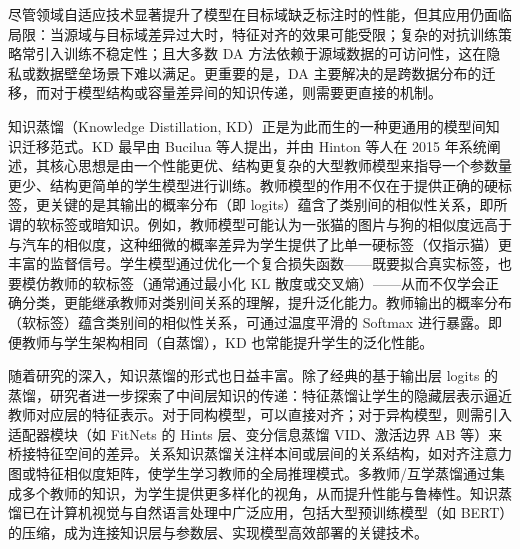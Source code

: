 \documentclass[../main.tex]{subfiles}
\begin{document}
尽管领域自适应技术显著提升了模型在目标域缺乏标注时的性能，但其应用仍面临局限：当源域与目标域差异过大时，特征对齐的效果可能受限；复杂的对抗训练策略常引入训练不稳定性；且大多数 DA 方法依赖于源域数据的可访问性，这在隐私或数据壁垒场景下难以满足\cite{surveytransferlearning_pan_2010,conditionaladversarialdomain_long_2018}。更重要的是，DA 主要解决的是跨数据分布的迁移，而对于模型结构或容量差异间的知识传递，则需要更直接的机制。

知识蒸馏（Knowledge Distillation, KD）正是为此而生的一种更通用的模型间知识迁移范式\cite{modelcompression_bucilua_2006,distillingknowledgeneural_hinton_2015}。KD 最早由 Bucilua 等人提出，并由 Hinton 等人在 2015 年系统阐述，其核心思想是由一个性能更优、结构更复杂的大型教师模型来指导一个参数量更少、结构更简单的学生模型进行训练。教师模型的作用不仅在于提供正确的硬标签，更关键的是其输出的概率分布（即 logits）蕴含了类别间的相似性关系，即所谓的软标签或暗知识。例如，教师模型可能认为一张猫的图片与狗的相似度远高于与汽车的相似度，这种细微的概率差异为学生提供了比单一硬标签（仅指示猫）更丰富的监督信号。学生模型通过优化一个复合损失函数——既要拟合真实标签，也要模仿教师的软标签（通常通过最小化 KL 散度或交叉熵）——从而不仅学会正确分类，更能继承教师对类别间关系的理解，提升泛化能力。教师输出的概率分布（软标签）蕴含类别间的相似性关系，可通过温度平滑的 Softmax 进行暴露\cite{distillingknowledgeneural_hinton_2015}。即便教师与学生架构相同（自蒸馏），KD 也常能提升学生的泛化性能\cite{bornagainneural_furlanello_2018}。

随着研究的深入，知识蒸馏的形式也日益丰富。除了经典的基于输出层 logits 的蒸馏，研究者进一步探索了中间层知识的传递：特征蒸馏让学生的隐藏层表示逼近教师对应层的特征表示\cite{fitnetshintsthin_romero_2015,variationalinformationdistillation_ahn_2019,knowledgetransfervia_heo_2019,payingmoreattention_zagoruyko_2017}。对于同构模型，可以直接对齐；对于异构模型，则需引入适配器模块（如 FitNets 的 Hints 层、变分信息蒸馏 VID、激活边界 AB 等）\cite{fitnetshintsthin_romero_2015}来桥接特征空间的差异。关系知识蒸馏关注样本间或层间的关系结构，如对齐注意力图或特征相似度矩阵\cite{relationalknowledgedistillation_park_2019}，使学生学习教师的全局推理模式。多教师/互学蒸馏通过集成多个教师的知识，为学生提供更多样化的视角，从而提升性能与鲁棒性\cite{deepmutuallearning_zhang_2018}。知识蒸馏已在计算机视觉与自然语言处理中广泛应用，包括大型预训练模型（如 BERT）的压缩\cite{tinybertdistillingbert_jiao_2020,distilbertdistilledversion_sanh_2019}，成为连接知识层与参数层、实现模型高效部署的关键技术。
\end{document}
